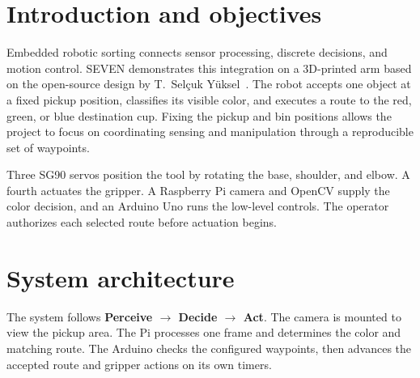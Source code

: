 \documentclass[11pt,a4paper]{article}
\begin{document}
\tableofcontents
\clearpage
{}

\section{Introduction and objectives}
Embedded robotic sorting connects sensor processing, discrete decisions, and motion control. SEVEN demonstrates this integration on a 3D-printed arm based on the open-source design by T.~Sel\c{c}uk Y\"uksel~\cite{seven}. The robot accepts one object at a fixed pickup position, classifies its visible color, and executes a route to the red, green, or blue destination cup. Fixing the pickup and bin positions allows the project to focus on coordinating sensing and manipulation through a reproducible set of waypoints.

Three SG90 servos position the tool by rotating the base, shoulder, and elbow. A fourth actuates the gripper. A Raspberry Pi camera and OpenCV supply the color decision, and an Arduino Uno runs the low-level controls. The operator authorizes each selected route before actuation begins.

\section{System architecture}
The system follows \textbf{Perceive $\rightarrow$ Decide $\rightarrow$ Act}. The camera is mounted to view the pickup area. The Pi processes one frame and determines the color and matching route. The Arduino checks the configured waypoints, then advances the accepted route and gripper actions on its own timers.

\begin{center}
\end{center}
\end{document}
